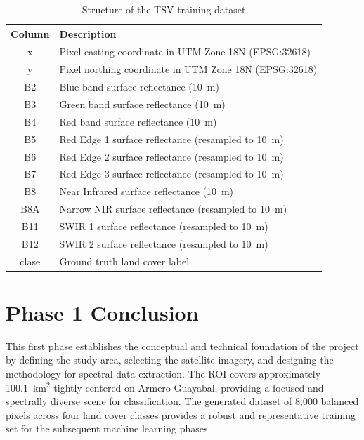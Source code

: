 \documentclass[12pt,a4paper]{article}
\begin{document}
\begin{table}[H]
\centering
\begin{tabular}{|c|m{9cm}|}
\hline
\textbf{Column} & \textbf{Description} \\
\hline
x   & Pixel easting coordinate in UTM Zone 18N (EPSG:32618) \\
\hline
y   & Pixel northing coordinate in UTM Zone 18N (EPSG:32618) \\
\hline
B2  & Blue band surface reflectance (10~m) \\
\hline
B3  & Green band surface reflectance (10~m) \\
\hline
B4  & Red band surface reflectance (10~m) \\
\hline
B5  & Red Edge 1 surface reflectance (resampled to 10~m) \\
\hline
B6  & Red Edge 2 surface reflectance (resampled to 10~m) \\
\hline
B7  & Red Edge 3 surface reflectance (resampled to 10~m) \\
\hline
B8  & Near Infrared surface reflectance (10~m) \\
\hline
B8A & Narrow NIR surface reflectance (resampled to 10~m) \\
\hline
B11 & SWIR 1 surface reflectance (resampled to 10~m) \\
\hline
B12 & SWIR 2 surface reflectance (resampled to 10~m) \\
\hline
clase & Ground truth land cover label \\
\hline
\end{tabular}
\caption{Structure of the TSV training dataset}
\end{table}

\section{Phase 1 Conclusion}

This first phase establishes the conceptual and technical foundation of the project by defining the study area, selecting the satellite imagery, and designing the methodology for spectral data extraction. The ROI covers approximately 100.1~km$^2$ tightly centered on Armero Guayabal, providing a focused and spectrally diverse scene for classification. The generated dataset of 8,000 balanced pixels across four land cover classes provides a robust and representative training set for the subsequent machine learning phases.
\end{document}
